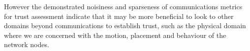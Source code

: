 However the demonstrated noisiness and sparseness of communications metrics for trust assessment indicate that it may be more beneficial to look to other domains beyond communications to establish trust, such as the physical domain where we are concerned with the motion, placement and behaviour of the network nodes.


